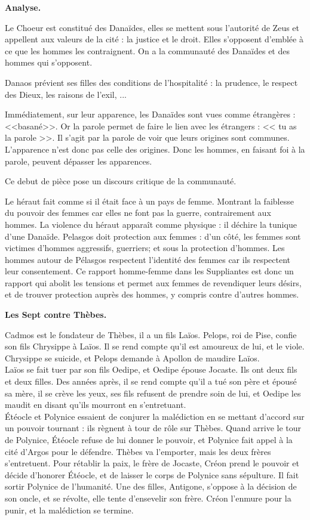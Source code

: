 \documentclass[11pt]{article}
\begin{document}
\bf{Analyse.}

Le Choeur est constitué des Danaïdes, elles se mettent sous l'autorité de Zeus et appellent aux valeurs de la cité : la justice et le droit. Elles s'opposent d'emblée à ce que les hommes les contraignent. On a la communauté des Danaïdes et des hommes qui s'opposent.

Danaos prévient ses filles des conditions de l'hospitalité : la prudence, le respect des Dieux, les raisons de l'exil, ...

Immédiatement, sur leur apparence, les Danaïdes sont vues comme étrangères : <<basané>>. Or la parole permet de faire le lien avec les étrangers : << tu as la parole >>. Il s'agit par la parole de voir que leurs origines sont communes. L'apparence n'est donc pas celle des origines. Donc les hommes, en faisant foi à la parole, peuvent dépasser les apparences.

Ce debut de pièce pose un discours critique de la communauté. 

Le héraut fait comme si il était face à un pays de femme. Montrant la faiblesse du pouvoir des femmes car elles ne font pas la guerre, contrairement aux hommes. La violence du héraut apparaît comme physique : il déchire la tunique d'une Danaïde. Pelasgos doit protection aux femmes : d'un côté, les femmes sont victimes d'hommes aggressifs, guerriers; et sous la protection d'hommes. Les hommes autour de Pélasgos respectent l'identité des femmes car ils respectent leur consentement. Ce rapport homme-femme dans les Suppliantes est donc un rapport qui abolit les tensions et permet aux femmes de revendiquer leurs désirs, et de trouver protection auprès des hommes, y compris contre d'autres hommes.

\bf{Les Sept contre Thèbes.}

Cadmos est le fondateur de Thèbes, il a un fils Laïos. Pelops, roi de Pise, confie son fils Chrysippe à Laïos. Il se rend compte qu'il est amoureux de lui, et le viole. Chrysippe se suicide, et Pelops demande à Apollon de maudire Laïos.\\
Laïos se fait tuer par son fils Oedipe, et Oedipe épouse Jocaste. Ils ont deux fils et deux filles. Des années après, il se rend compte qu'il a tué son père et épousé sa mère, il se crève les yeux, ses fils refusent de prendre soin de lui, et Oedipe les maudit en disant qu'ils mourront en s'entretuant.\\
Étéocle et Polynice essaient de conjurer la malédiction en se mettant d'accord sur un pouvoir tournant : ils règnent à tour de rôle sur Thèbes. Quand arrive le tour de Polynice, Étéocle refuse de lui donner le pouvoir, et Polynice fait appel à la cité d'Argos pour le défendre. Thèbes va l'emporter, mais les deux frères s'entretuent. Pour rétablir la paix, le frère de Jocaste, Créon prend le pouvoir et décide d'honorer Étéocle, et de laisser le corps de Polynice sans sépulture. Il fait sortir Polynice de l'humanité.
Une des filles, Antigone, s'oppose à la décision de son oncle, et se révolte, elle tente d'ensevelir son frère. Créon l'enmure pour la punir, et la malédiction se termine.
\end{document}
